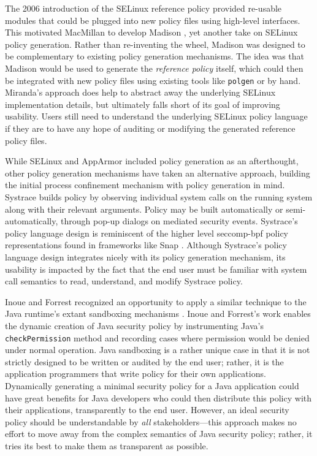 \documentclass[dvipsnames, 12pt]{article}
\begin{document}
The 2006 introduction of the SELinux reference policy \cite{pebenito2006_refpol}
provided re-usable modules that could be plugged into new policy files using
high-level interfaces. This motivated MacMillan to develop Madison
\cite{macmillan07_madison}, yet another take on SELinux policy generation.
Rather than re-inventing the wheel, Madison was designed to be complementary to
existing policy generation mechanisms. The idea was that Madison would be used
to generate the \textit{reference policy} itself, which could then be integrated
with new policy files using existing tools like \texttt{polgen} or by hand.
Miranda's approach does help to abstract away the underlying SELinux
implementation details, but ultimately falls short of its goal of improving
usability. Users still need to understand the underlying SELinux policy language
if they are to have any hope of auditing or modifying the generated reference
policy files.

While SELinux and AppArmor included policy generation as an afterthought, other
policy generation mechanisms have taken an alternative approach, building the
initial process confinement mechanism with policy generation in mind.
Systrace \cite{provos2003_systrace} builds policy by observing individual system
calls on the running system along with their relevant arguments. Policy may be
built automatically or semi-automatically, through pop-up dialogs on mediated
security events. Systrace's policy language design is reminiscent of the higher
level seccomp-bpf policy representations found in frameworks like Snap
\cite{snap}.  Although Systrace's policy language design integrates nicely with
its policy generation mechanism, its usability is impacted by the fact that the
end user must be familiar with system call semantics to read, understand, and
modify Systrace policy.

Inoue and Forrest \cite{inoue05_java, inoue05_thesis} recognized an opportunity
to apply a similar technique to the Java runtime's extant sandboxing mechanisms
\cite{gong1993_java2}. Inoue and Forrest's work enables the dynamic creation
of Java security policy by instrumenting Java's \texttt{checkPermission} method
and recording cases where permission would be denied under normal operation.
Java sandboxing is a rather unique case in that it is not strictly designed to
be written or audited by the end user; rather, it is the application programmers
that write policy for their own applications. Dynamically generating a minimal
security policy for a Java application could have great benefits for Java
developers who could then distribute this policy with their applications,
transparently to the end user.  However, an ideal security policy should be
understandable by \textit{all} stakeholders---this approach makes no effort to
move away from the complex semantics of Java security policy; rather, it tries
its best to make them as transparent as possible.
\end{document}
